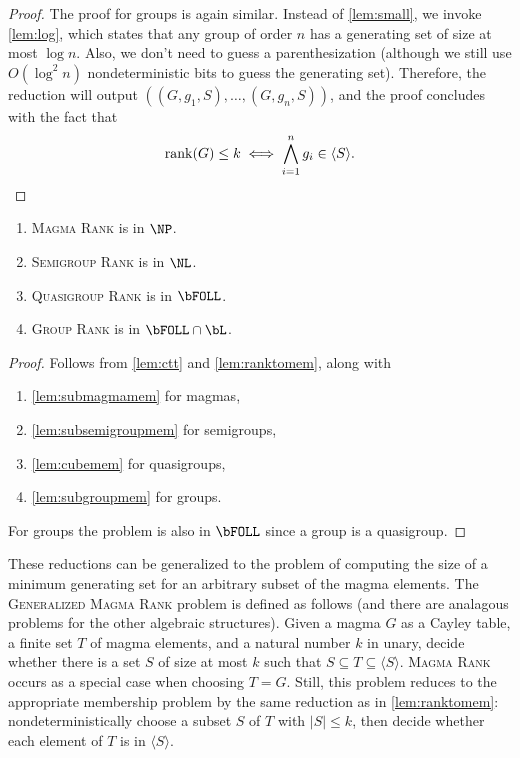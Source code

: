 \documentclass{article}
\newcommand{\todo}[1]{\textbf{TODO #1}}
\newcommand{\gen}[1]{\langle #1 \rangle}
\DeclareMathOperator{\rank}{rank}
\begin{document}
\begin{proof}
  The proof for groups is again similar.
  Instead of \autoref{lem:small}, we invoke \autoref{lem:log}, which states that any group of order $n$ has a generating set of size at most $\log n$.
  Also, we don't need to guess a parenthesization (although we still use $O(\log^2 n)$ nondeterministic bits to guess the generating set).
  Therefore, the reduction will output $((G, g_1, S), \dotsc, (G, g_n, S))$, and the proof concludes with the fact that
  \begin{equation*}
    \rank(G) \leq k \iff \bigwedge_{i = 1}^n g_i \in \gen{S}.
    \qedhere
  \end{equation*}
\end{proof}


\begin{theorem}\label{thm:rank}
  \mbox{}
  \begin{enumerate}
  \item \textsc{Magma Rank} is in $\NP$.
  \item \textsc{Semigroup Rank} is in $\NL$.
  \item \textsc{Quasigroup Rank} is in $\bFOLL$.
  \item \textsc{Group Rank} is in $\bFOLL \cap \bL$.
  \end{enumerate}
\end{theorem}
\begin{proof}
  Follows from \autoref{lem:ctt} and \autoref{lem:ranktomem}, along with
  \begin{enumerate}
  \item \autoref{lem:submagmamem} for magmas,
  \item \autoref{lem:subsemigroupmem} for semigroups,
  \item \autoref{lem:cubemem} for quasigroups,
  \item \autoref{lem:subgroupmem} for groups.
  \end{enumerate}
  For groups the problem is also in $\bFOLL$ since a group is a quasigroup.
\end{proof}

These reductions can be generalized to the problem of computing the size of a minimum generating set for an arbitrary subset of the magma elements.
The \textsc{Generalized Magma Rank} problem is defined as follows (and there are analagous problems for the other algebraic structures).
Given a magma $G$ as a Cayley table, a finite set $T$ of magma elements, and a natural number $k$ in unary, decide whether there is a set $S$ of size at most $k$ such that $S \subseteq T \subseteq \gen{S}$.
\textsc{Magma Rank} occurs as a special case when choosing $T = G$.
Still, this problem reduces to the appropriate membership problem by the same reduction as in \autoref{lem:ranktomem}: nondeterministically choose a subset $S$ of $T$ with $|S| \leq k$, then decide whether each element of $T$ is in $\gen{S}$.
\end{document}
